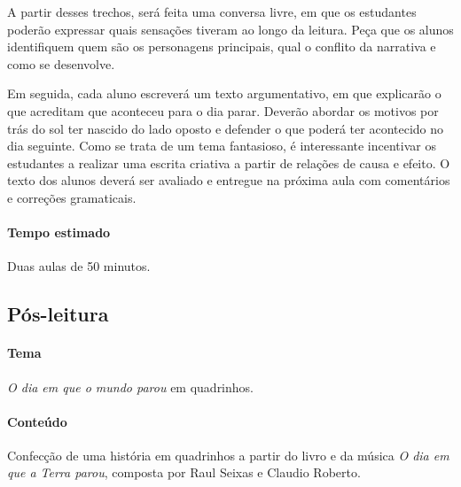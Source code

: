 \documentclass[11pt]{extarticle}
\begin{document}
A partir desses trechos, será feita uma conversa livre, em que os estudantes poderão expressar quais sensações tiveram ao longo da leitura. Peça que os alunos identifiquem quem são os personagens principais, qual o conflito da narrativa e como se desenvolve.


Em seguida, cada aluno escreverá um texto argumentativo, em que explicarão o que acreditam que aconteceu para o dia parar. Deverão abordar os motivos por trás do sol ter nascido do lado oposto e defender o que poderá ter acontecido no dia seguinte. Como se trata de um tema fantasioso, é interessante incentivar os estudantes a realizar uma escrita criativa a partir de relações de causa e efeito. O texto dos alunos deverá ser avaliado e entregue na próxima aula com comentários e correções gramaticais.

\paragraph{Tempo estimado} Duas aulas de 50 minutos.

\subsection{Pós-leitura}


\paragraph{Tema} \textit{O dia em que o mundo parou} em quadrinhos.

\paragraph{Conteúdo} Confecção de uma história em quadrinhos a partir do livro e da música \textit{O dia em que a Terra parou}, composta por Raul Seixas e Claudio Roberto.

\end{document}
